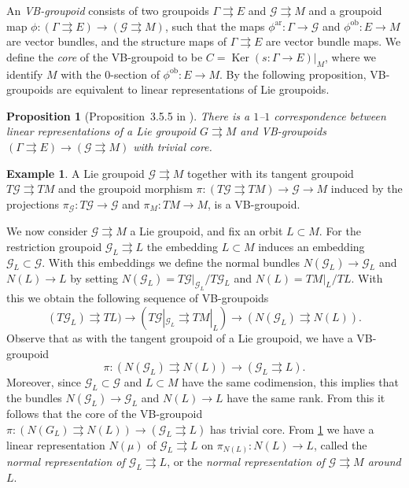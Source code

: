 \documentclass[12pt,a4paper,reqno]{amsart}
\DeclareMathOperator{\kernel}{Ker}
\newcommand{\1}{\mathbbm{1}} %
\newcommand{\ar}{\mathrm{ar}}
\newcommand{\G}{\mathcal{G}} %
\newcommand{\ob}{\mathrm{ob}}
\newtheorem{proposition}[thm]{Proposition}
\theoremstyle{definition}
\newtheorem{example}[thm]{Example}
\theoremstyle{TheoremNum}
\begin{document}
An \emph{VB-groupoid} consists of two groupoids $\Gamma\rightrightarrows E$ and $\G\rightrightarrows M$ and a groupoid map $\phi\colon (\Gamma\rightrightarrows E) \to (\G\rightrightarrows M)$, such that the maps $\phi^{\ar}\colon \Gamma\to \G$ and $\phi^{\ob}\colon E\to M$ are vector bundles, and the structure maps of $\Gamma\rightrightarrows E$ are vector bundle maps. We define the \emph{core} of the VB-groupoid to be $C = \kernel(s\colon \Gamma\to E)|_M$, where we identify $M$ with the $0$-section of $\phi^{\ob}\colon E\to M$. By the following proposition, VB-groupoids are equivalent to linear representations of Lie groupoids.

\begin{proposition}[Proposition~3.5.5 in \cite{delHoyo2013}]\th\label{P: correspondence between VB-groupoids and representations}
There is a $1$--$1$ correspondence between linear representations of a Lie groupoid $G\rightrightarrows M$ and VB-groupoids $(\Gamma\rightrightarrows E) \to (\G\rightrightarrows M)$  with trivial core.
\end{proposition}

\begin{example}
A Lie groupoid $\G\rightrightarrows M$ together with its tangent groupoid $T\G\rightrightarrows TM$ and  the groupoid morphism $\pi\colon (T\G\rightrightarrows TM)\to \G\to M$ induced by the projections $\pi_{\G}\colon T\G\to \G$ and $\pi_M\colon TM\to M$, is a VB-groupoid. 
\end{example}

We now consider $\G\rightrightarrows M$ a Lie groupoid, and fix an orbit $L\subset M$. For the restriction groupoid $\G_{L}\rightrightarrows L$ the embedding $L\subset M$ induces an embedding $\G_L\subset \G$. With this embeddings we define the normal bundles $N(\G_L)\to \G_L$ and $N(L)\to L$ by setting $N(\G_L) = T\G|_{\G_L}/T\G_L$ and $N(L) = TM|_L/TL$. With this we obtain the following sequence of VB-groupoids
\[
(T\G_L)\rightrightarrows TL)\to (T\G|_{\G_L}\rightrightarrows TM|_{L})\to (N(\G_L)\rightrightarrows N(L)).
\]
Observe that as with the tangent groupoid of a Lie groupoid, we have a VB-groupoid 
\[
\pi\colon (N(\G_L)\rightrightarrows N(L))\to (\G_L\rightrightarrows L).
\] 
Moreover, since $\G_L\subset \G$ and $L\subset M$ have the same codimension, this implies that the bundles $N(\G_L)\to \G_L	$ and $N(L)\to L$ have the same rank.  From this it follows that the core of the VB-groupoid 	$\pi\colon (N(G_L)\rightrightarrows N(L))\to (\G_L\rightrightarrows L)$	has trivial core. From \th\ref{P: correspondence between VB-groupoids and representations} we have  a linear representation	$N(\mu)$ of $\G_L\rightrightarrows L$ on \linebreak$\pi_{N(L)}\colon N(L)\to L$, called the \emph{normal representation of $\G_L\rightrightarrows L$}, or the \emph{normal representation of $\G\rightrightarrows M$ around $L$}.	
\end{document}

